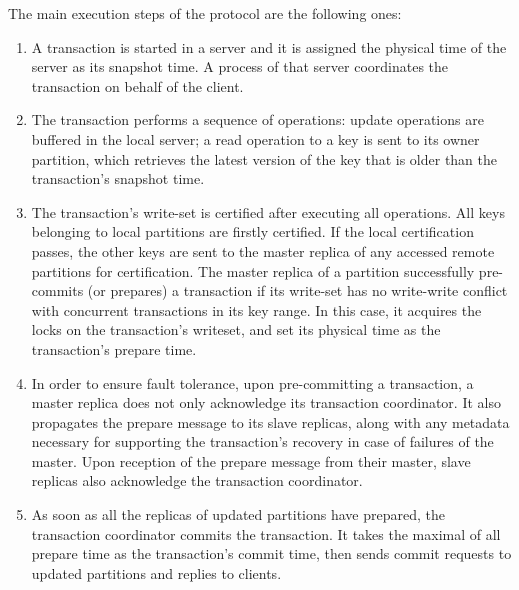 The main execution steps of the protocol are the following ones:
\begin{enumerate}
\item A transaction is started in a server and it is assigned the physical time of the server as its snapshot time. A process of that server coordinates the transaction on behalf of the client.
\item The transaction performs a sequence of operations: update operations are buffered in the local server; a read operation to a key is sent to its owner partition, which retrieves the latest version of the key that is older than the transaction's snapshot time.
\item The transaction's write-set is certified after executing all operations. All keys belonging to local partitions are firstly certified. If the local certification passes, the other keys are sent to the master replica of any accessed remote partitions for certification. The master replica of a partition successfully pre-commits (or prepares) a transaction if its write-set has no write-write conflict with concurrent transactions in its key range. In this case, it acquires the locks on the transaction's writeset, and set its physical time as the transaction's prepare time.
\item In order to ensure fault tolerance, upon pre-committing a transaction, a master replica does not only acknowledge its transaction coordinator. It also propagates the prepare message to its slave replicas, along with any metadata necessary for supporting the transaction's recovery in case of failures of the master. Upon reception of the prepare message from their master, slave replicas also acknowledge the transaction coordinator.
\item As soon as all the replicas of updated partitions have prepared, the transaction coordinator commits the transaction. It takes the maximal of all prepare time as the transaction's commit time, then sends commit requests to updated partitions and  replies to clients.
\end{enumerate}

